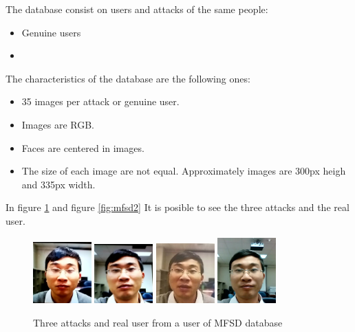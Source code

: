 The database consist on users and attacks of the same people:\\
\begin{itemize}
\item Genuine users
\item
\end{itemize}

The characteristics of the database are the following ones:\\

\begin{itemize}
\item 35 images per attack or genuine user.
\item Images are RGB.
\item Faces are centered in images.
\item The size of each image are not equal. Approximately images are 300px heigh and 335px width.
\end{itemize}

In figure \ref{fig:mfsd} and figure \ref{fig:mfsd2} It is posible to see the three attacks and the real user.\\

\begin{figure}[htb]
\centering
\includegraphics[width=0.2\textwidth]{images_databases/MFSD/at1-1.jpg}
\includegraphics[width=0.2\textwidth]{images_databases/MFSD/at2-1.jpg}
\includegraphics[width=0.2\textwidth]{images_databases/MFSD/at3-1.jpg}
\includegraphics[width=0.2\textwidth]{images_databases/MFSD/1.jpg}
\caption{Three attacks and real user from a user of MFSD database } \label{fig:mfsd}
\end{figure}

